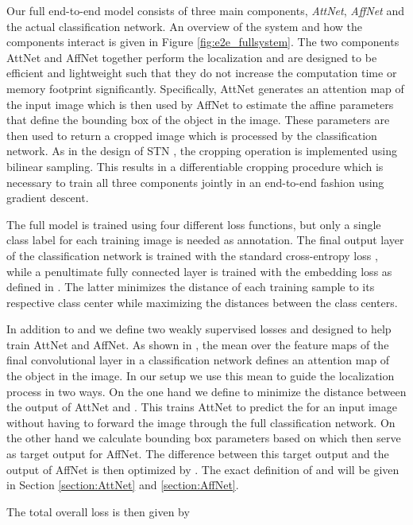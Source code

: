 \documentclass{bmvc2k}
\begin{document}
Our full end-to-end model consists of three main components, \emph{AttNet}, \emph{AffNet} and the actual classification network. An overview of the system and how the components interact is given in Figure \ref{fig:e2e_fullsystem}. The two components AttNet and AffNet together perform the localization and are designed to be efficient and lightweight such that they do not increase the computation time or memory footprint significantly. Specifically, AttNet generates an attention map of the input image which is then used by AffNet to estimate the affine parameters that define the bounding box of the object in the image. These parameters are then used to return a cropped image which is processed by the classification network. As in the design of STN \cite{jaderberg2015spatial}, the cropping operation is implemented using bilinear sampling. This results in a differentiable cropping procedure which is necessary to train all three components jointly in an end-to-end fashion using gradient descent. 

The full model is trained using four different loss functions, but only a single class label for each training image is needed as annotation. The final output layer of the classification network is trained with the standard cross-entropy loss , while a penultimate fully connected layer is trained with the embedding loss  as defined in \cite{Hanselmann_2020_WACV}. The latter minimizes the distance of each training sample to its respective class center while maximizing the distances between the class centers. 

In addition to  and  we define two weakly supervised losses  and  designed to help train AttNet and AffNet. As shown in \cite{zhou2016learning}, the mean  over the feature maps of the final convolutional layer in a classification network defines an attention map of the object in the image. In our setup we use this mean to guide the localization process in two ways. On the one hand we define  to minimize the distance between the output of AttNet and . This trains AttNet to predict the  for an input image without having to forward the image through the full classification network. On the other hand we calculate bounding box parameters based on  which then serve as target output for AffNet. The difference between this target output and the output of AffNet is then optimized by . The exact definition of  and  will be given in Section \ref{section:AttNet} and \ref{section:AffNet}. 

The total overall loss is then given by
\end{document}
